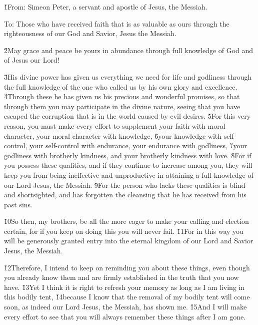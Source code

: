 


\v{1}From: Simeon Peter, a servant and apostle of Jesus, the Messiah.

To: Those who have received faith that is as valuable as ours through the righteousness of our God and Savior, Jesus the Messiah.

\v{2}May grace and peace be yours in abundance through full knowledge of God and of Jesus our Lord!

\v{3}His divine power has given us everything we need for life and godliness through the full knowledge of the one who called us by his own glory and excellence. \v{4}Through these he has given us his precious and wonderful promises, so that through them you may participate in the divine nature, seeing that you have escaped the corruption that is in the world caused by evil desires. \v{5}For this very reason, you must make every effort to supplement your faith with moral character, your moral character with knowledge, \v{6}your knowledge with self-control, your self-control with endurance, your endurance with godliness, \v{7}your godliness with brotherly kindness, and your brotherly kindness with love. \v{8}For if you possess these qualities, and if they continue to increase among you, they will keep you from being ineffective and unproductive in attaining a full knowledge of our Lord Jesus, the Messiah. \v{9}For the person who lacks these qualities is blind and shortsighted, and has forgotten the cleansing that he has received from his past sins.

\v{10}So then, my brothers, be all the more eager to make your calling and election certain, for if you keep on doing this you will never fail. \v{11}For in this way you will be generously granted entry into the eternal kingdom of our Lord and Savior Jesus, the Messiah.

\v{12}Therefore, I intend to keep on reminding you about these things, even though you already know them and are firmly established in the truth that you now have. \v{13}Yet I think it is right to refresh your memory as long as I am living in this bodily tent, \v{14}because I know that the removal of my bodily tent will come soon, as indeed our Lord Jesus, the Messiah, has shown me. \v{15}And I will make every effort to see that you will always remember these things after I am gone.

